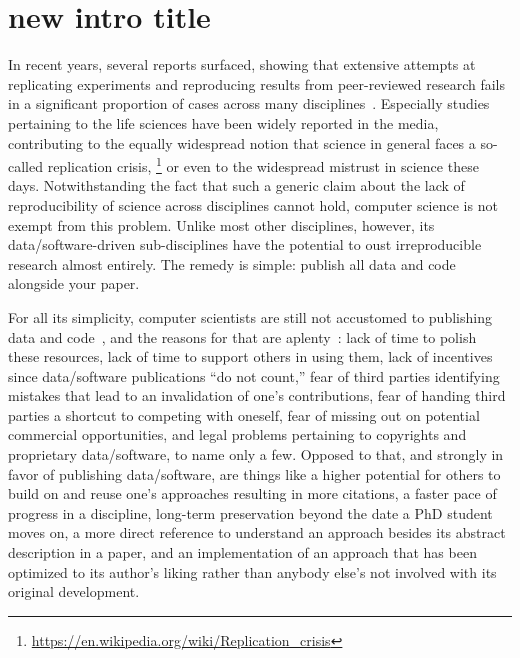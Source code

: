\section{new intro title}

In recent years, several reports surfaced, showing that extensive attempts at replicating experiments and reproducing results from peer-reviewed research fails in a significant proportion of cases across many disciplines~\cite{ionnadis:2005,anderson:2017}. Especially studies pertaining to the life sciences have been widely reported in the media, contributing to the equally widespread notion that science in general faces a so-called replication crisis,%
\footnote{\scriptsize\url{https://en.wikipedia.org/wiki/Replication_crisis}}
or even to the widespread mistrust in science these days. Notwithstanding the fact that such a generic claim about the lack of reproducibility of science across disciplines cannot hold, computer science is not exempt from this problem. Unlike most other disciplines, however, its data/software-driven sub-disciplines have the potential to oust irreproducible research almost entirely. The remedy is simple: publish all data and code alongside your paper.

For all its simplicity, computer scientists are still not accustomed to publishing data and code~\cite{collberg:2015}, and the reasons for that are aplenty~\cite{stodden:2010}: lack of time to polish these resources, lack of time to support others in using them, lack of incentives since data/software publications ``do not count,'' fear of third parties identifying mistakes that lead to an invalidation of one's contributions, fear of handing third parties a shortcut to competing with oneself, fear of missing out on potential commercial opportunities, and legal problems pertaining to copyrights and proprietary data/software, to name only a few.
Opposed to that, and strongly in favor of publishing data/software, are things like a higher potential for others to build on and reuse one's approaches resulting in more citations, a faster pace of progress in a discipline, long-term preservation beyond the date a PhD student moves on, a more direct reference to understand an approach besides its abstract description in a paper, and an implementation of an approach that has been optimized to its author's liking rather than anybody else's not involved with its original development.

